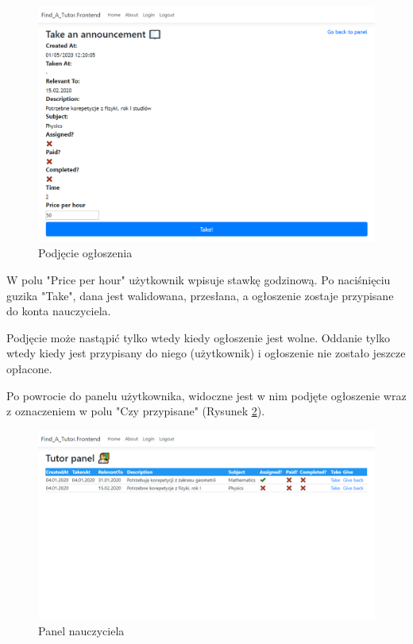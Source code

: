 \documentclass[12pt]{article}
\newcommand{\cmark}{\textcolor{green!80!black}{\ding{51}}}
\numberwithin{figure}{section}
\begin{document}
\begin{sloppypar}
\begin{figure}[!htbp] 
    \centering
    \includegraphics[width=1\textwidth]{images/chapter_4/take.png}
    \caption{Podjęcie ogłoszenia}
    \label{fig:take}
\end{figure}

W polu "Price per hour" użytkownik wpisuje stawkę godzinową. Po naciśnięciu guzika "Take", dana jest walidowana, przesłana, a ogłoszenie zostaje przypisane do konta nauczyciela.

Podjęcie może nastąpić tylko wtedy kiedy ogłoszenie jest wolne. Oddanie tylko wtedy kiedy jest przypisany do niego (użytkownik) i ogłoszenie nie zostało jeszcze opłacone.

Po powrocie do panelu użytkownika, widoczne jest w nim podjęte ogłoszenie wraz z oznaczeniem \cmark w polu "Czy przypisane" (Rysunek \ref{fig:tutor-assigned}).
\begin{figure}[!htbp] 
    \centering
    \includegraphics[width=1\textwidth]{images/chapter_4/tutor-assigned.png}
    \caption{Panel nauczyciela}
    \label{fig:tutor-assigned}
\end{figure}


\end{sloppypar}
\end{document}
